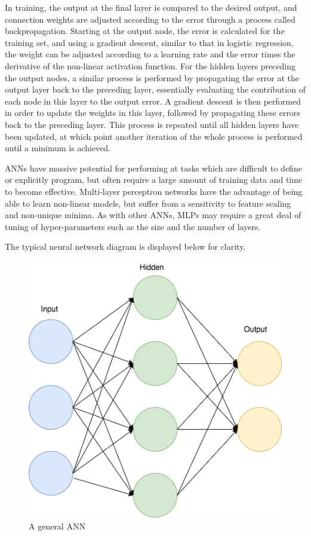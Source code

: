 In training, the output at the final layer is compared to the desired output, and connection weights are adjusted according to the error through a process called backpropagation.
Starting at the output node, the error is calculated for the training set, and using a gradient descent, similar to that in logistic regression, the weight can be adjusted according to a learning rate and the error times the derivative of the non-linear activation function.
For the hidden layers preceding the output nodes, a similar process is performed by propagating the error at the output layer back to the preceding layer, essentially evaluating the contribution of each node in this layer to the output error.
A gradient descent is then performed in order to update the weights in this layer, followed by propagating these errors back to the preceding layer.
This process is repeated until all hidden layers have been updated, at which point another iteration of the whole process is performed until a minimum is achieved.


ANNs have massive potential for performing at tasks which are difficult to define or explicitly program, but often require a large amount of training data and time to become effective.
Multi-layer perceptron networks have the advantage of being able to learn non-linear models, but suffer from a sensitivity to feature scaling and non-unique minima.
As with other ANNs, MLPs may require a great deal of tuning of hyper-parameters such as the size and the number of layers.

The typical neural network diagram is displayed below for clarity.

\begin{figure}[htb]
\centering
\includegraphics[scale=.50]{figures/NN}
\caption{A general ANN}
\label{fig:tamu-fig3}
\end{figure}


